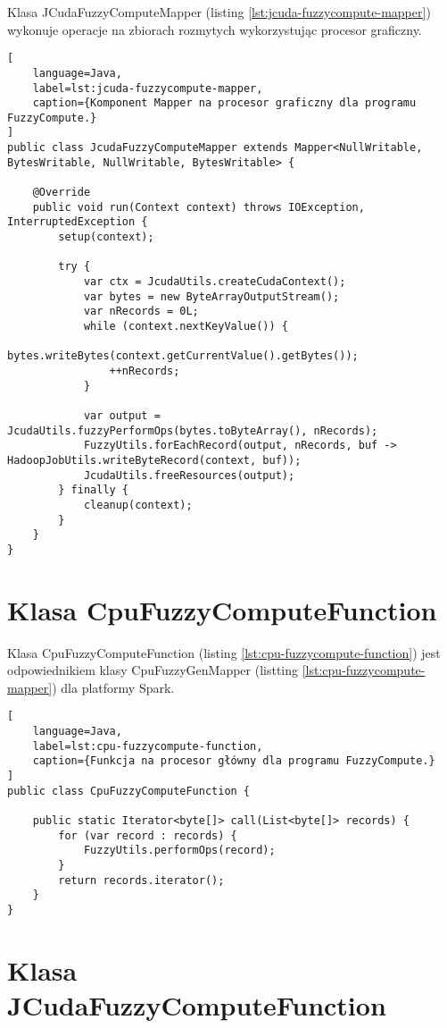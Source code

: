 Klasa JCudaFuzzyComputeMapper (listing \ref{lst:jcuda-fuzzycompute-mapper}) wykonuje operacje na zbiorach rozmytych wykorzystując procesor graficzny.

\begin{lstlisting}[
    language=Java,
    label=lst:jcuda-fuzzycompute-mapper,
    caption={Komponent Mapper na procesor graficzny dla programu FuzzyCompute.}
]
public class JcudaFuzzyComputeMapper extends Mapper<NullWritable, BytesWritable, NullWritable, BytesWritable> {

    @Override
    public void run(Context context) throws IOException, InterruptedException {
        setup(context);

        try {
            var ctx = JcudaUtils.createCudaContext();
            var bytes = new ByteArrayOutputStream();
            var nRecords = 0L;
            while (context.nextKeyValue()) {
                bytes.writeBytes(context.getCurrentValue().getBytes());
                ++nRecords;
            }

            var output = JcudaUtils.fuzzyPerformOps(bytes.toByteArray(), nRecords);
            FuzzyUtils.forEachRecord(output, nRecords, buf -> HadoopJobUtils.writeByteRecord(context, buf));
            JcudaUtils.freeResources(output);
        } finally {
            cleanup(context);
        }
    }
}
\end{lstlisting}
\newpage

\section*{Klasa CpuFuzzyComputeFunction} \label{ch:cpu-fuzzycompute-function}

Klasa CpuFuzzyComputeFunction (listing \ref{lst:cpu-fuzzycompute-function}) jest odpowiednikiem
klasy CpuFuzzyGenMapper (listting \ref{lst:cpu-fuzzycompute-mapper}) dla platformy Spark.

\begin{lstlisting}[
    language=Java,
    label=lst:cpu-fuzzycompute-function,
    caption={Funkcja na procesor główny dla programu FuzzyCompute.}
]
public class CpuFuzzyComputeFunction {

    public static Iterator<byte[]> call(List<byte[]> records) {
        for (var record : records) {
            FuzzyUtils.performOps(record);
        }
        return records.iterator();
    }
}
\end{lstlisting}
\newpage

\section*{Klasa JCudaFuzzyComputeFunction} \label{ch:jcuda-fuzzycompute-function}

